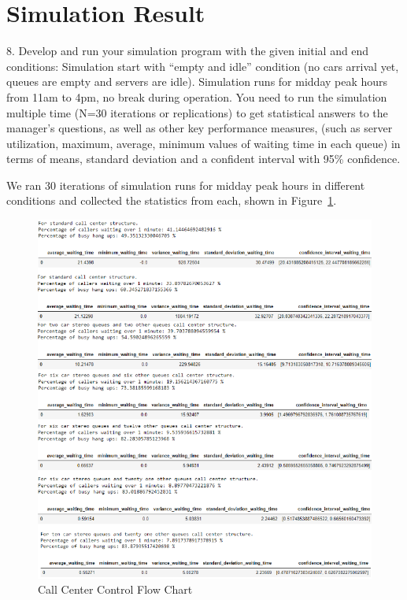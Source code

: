 \documentclass{article}
\begin{document}
\section{Simulation Result}
8. Develop and run your simulation program with the given initial and end conditions:  Simulation start with “empty and idle” condition (no cars arrival yet, queues are empty and servers are idle).  Simulation runs for midday peak hours from 11am to 4pm, no break during operation.  You need to run the simulation multiple time (N=30 iterations or replications) to get statistical answers to the manager’s questions, as well as other key performance measures, (such as server utilization, maximum, average, minimum values of waiting time in each queue) in terms of means, standard deviation and a confident interval with 95\% confidence. \\

\par
We ran 30 iterations of simulation runs for midday peak hours in different conditions and collected the statistics from each, shown in Figure~\ref{fig:mqr}.

\begin{figure}[t!]
\centering
\includegraphics[width=1.1\textwidth]{multiple_queue_results.png}
\caption{Call Center Control Flow Chart}
\label{fig:mqr}
\end{figure}
\end{document}

